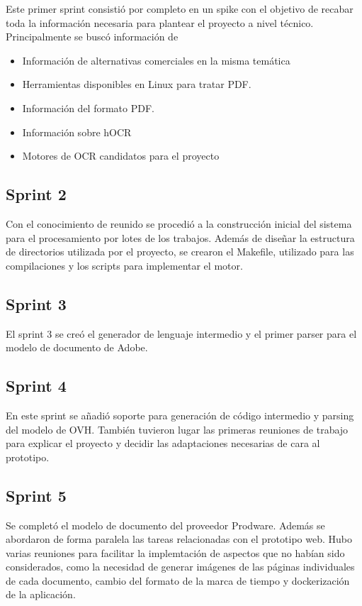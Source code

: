 Este primer sprint consistió por completo en un spike con el objetivo de recabar toda la información necesaria para plantear el proyecto a nivel técnico. Principalmente se buscó información de

\begin{itemize}
    \item Información de alternativas comerciales en la misma temática
    \item Herramientas disponibles en Linux para tratar PDF.
    \item Información del formato PDF.
    \item Información sobre hOCR
    \item Motores de OCR candidatos para el proyecto
\end{itemize}

\subsection{Sprint 2}

Con el conocimiento de reunido se procedió a la construcción inicial del sistema para el procesamiento por lotes de los trabajos. Además de diseñar la estructura de directorios utilizada por el proyecto, se crearon el Makefile, utilizado para las compilaciones y los scripts para implementar el motor.

\subsection{Sprint 3}

El sprint 3 se creó el generador de lenguaje intermedio y el primer parser para el modelo de documento de Adobe.

\subsection{Sprint 4}

En este sprint se añadió soporte para generación de código intermedio y parsing del modelo de OVH. También tuvieron lugar las primeras reuniones de trabajo para explicar el proyecto y decidir las adaptaciones necesarias de cara al prototipo.

\subsection{Sprint 5}

Se completó el modelo de documento del proveedor Prodware. Además se abordaron de forma paralela las tareas relacionadas con el prototipo web. Hubo varias reuniones para facilitar la implemtación de aspectos que no habían sido considerados, como  la necesidad de generar imágenes de las páginas individuales de cada documento, cambio del formato de la marca de tiempo y dockerización de la aplicación.

